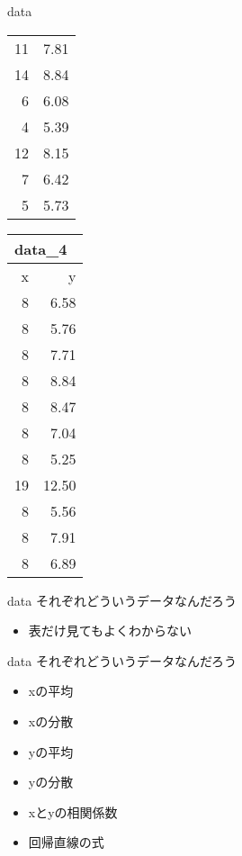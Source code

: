 \documentclass[
  ignorenonframetext,
]{beamer}
\providecommand{\tightlist}{%
  \setlength{\itemsep}{0pt}\setlength{\parskip}{0pt}}
\begin{document}
\begin{frame}{data}
\begin{tabular}{rr}
11 & 7.81\\
14 & 8.84\\
6 & 6.08\\
4 & 5.39\\
12 & 8.15\\
7 & 6.42\\
5 & 5.73\\
\bottomrule
\end{tabular}\hfill
\begin{tabular}{rr}
\multicolumn{2}{l}{data\_4}\\
\toprule
x & y\\
\midrule
8 & 6.58\\
8 & 5.76\\
8 & 7.71\\
8 & 8.84\\
8 & 8.47\\
8 & 7.04\\
8 & 5.25\\
19 & 12.50\\
8 & 5.56\\
8 & 7.91\\
8 & 6.89\\
\bottomrule
\end{tabular}
\end{frame}

\begin{frame}{data}
\protect\hypertarget{data-2}{}
それぞれどういうデータなんだろう

\begin{itemize}[<+->]
\tightlist
\item
  表だけ見てもよくわからない
\end{itemize}
\end{frame}

\begin{frame}{data}
\protect\hypertarget{data-3}{}
それぞれどういうデータなんだろう

\begin{itemize}[<+->]
\tightlist
\item
  xの平均
\item
  xの分散
\item
  yの平均
\item
  yの分散
\item
  xとyの相関係数
\item
  回帰直線の式
\end{itemize}
\end{frame}
\end{document}
